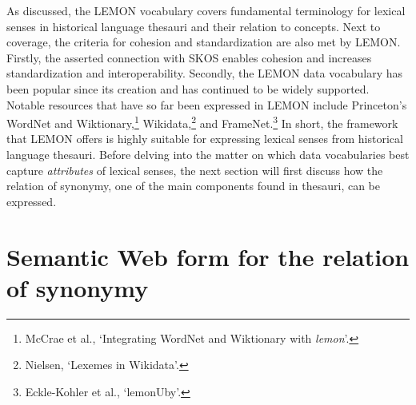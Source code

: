 As discussed, the LEMON vocabulary covers fundamental terminology for lexical senses in historical language thesauri and their relation to concepts. Next to coverage, the criteria for cohesion and standardization are also met by LEMON. Firstly, the asserted connection with SKOS enables cohesion and increases standardization and interoperability. Secondly, the LEMON data vocabulary has been popular since its creation and has continued to be widely supported. 
Notable resources that have so far been expressed in LEMON include Princeton's WordNet and Wiktionary,\footnote{McCrae et al., `Integrating WordNet and Wiktionary with \textit{lemon}'.} %
Wikidata,\footnote{Nielsen, `Lexemes in Wikidata'.} and FrameNet.\footnote{Eckle-Kohler et al., `lemonUby'.} %
In short, the framework that LEMON offers is highly suitable for expressing lexical senses from historical language thesauri. Before delving into the matter on which data vocabularies best capture \emph{attributes} of lexical senses, the next section will first discuss how the relation of synonymy, one of the main components found in thesauri, can be expressed.

\section{Semantic Web form for the relation of synonymy}
\label{sect:Stolk_thes-digital-form:semweb-syn}

